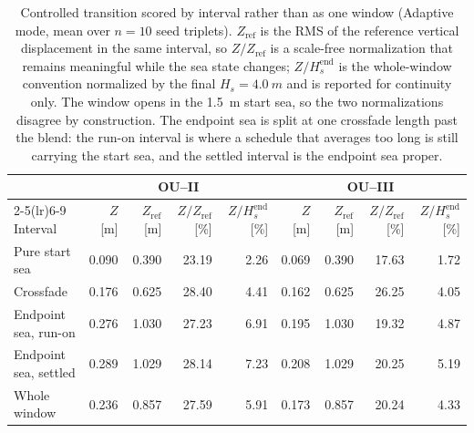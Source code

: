 \begin{table}[t]
  \centering
  \caption{Controlled transition scored by interval rather than as one window (Adaptive mode, mean over $n=10$ seed triplets). $Z_{\mathrm{ref}}$ is the RMS of the reference vertical displacement in the same interval, so $Z/Z_{\mathrm{ref}}$ is a scale-free normalization that remains meaningful while the sea state changes; $Z/H_s^{\mathrm{end}}$ is the whole-window convention normalized by the final $H_s=\SI{4.0}{m}$ and is reported for continuity only. The window opens in the \SI{1.5}{m} start sea, so the two normalizations disagree by construction. The endpoint sea is split at one crossfade length past the blend: the run-on interval is where a schedule that averages too long is still carrying the start sea, and the settled interval is the endpoint sea proper.}
  \label{tab:ou_transition_segments}
  \footnotesize
  \setlength{\tabcolsep}{3.4pt}
  \begin{tabular}{@{}lrrrrrrrr@{}}
    \toprule
    & \multicolumn{4}{c}{OU--II} & \multicolumn{4}{c}{OU--III} \\
    \cmidrule(lr){2-5}\cmidrule(lr){6-9}
    Interval & $Z$ [m] & $Z_{\mathrm{ref}}$ [m] & $Z/Z_{\mathrm{ref}}$ [\%] & $Z/H_s^{\mathrm{end}}$ [\%] & $Z$ [m] & $Z_{\mathrm{ref}}$ [m] & $Z/Z_{\mathrm{ref}}$ [\%] & $Z/H_s^{\mathrm{end}}$ [\%] \\
    \midrule
    Pure start sea & 0.090 & 0.390 & 23.19 & 2.26 & 0.069 & 0.390 & 17.63 & 1.72 \\
    Crossfade & 0.176 & 0.625 & 28.40 & 4.41 & 0.162 & 0.625 & 26.25 & 4.05 \\
    Endpoint sea, run-on & 0.276 & 1.030 & 27.23 & 6.91 & 0.195 & 1.030 & 19.32 & 4.87 \\
    Endpoint sea, settled & 0.289 & 1.029 & 28.14 & 7.23 & 0.208 & 1.029 & 20.25 & 5.19 \\
    Whole window & 0.236 & 0.857 & 27.59 & 5.91 & 0.173 & 0.857 & 20.24 & 4.33 \\
    \bottomrule
  \end{tabular}
\end{table}


